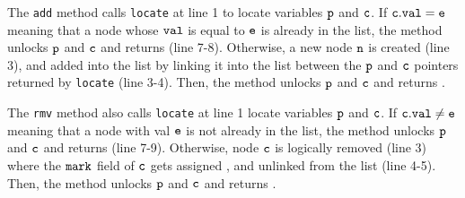  


The {\tt add} method calls {\tt locate} at line 1 to locate variables $\tt p$ and $\tt c$. If $\tt c.val = e$ meaning that a node whose $\tt val$ is equal to $\tt e$ is already in the list, the method unlocks $\tt p$ and $\tt c$ and returns \false \; (line 7-8). Otherwise, a new node $\tt n$ is created (line 3), and added into the list by linking it into the list between the $\tt p$ and $\tt c$ pointers returned by
{\tt locate} (line 3-4). Then, the method unlocks $\tt p$ and $\tt c$ and returns \true.  

The {\tt rmv} method also calls {\tt locate} at line 1 locate variables $\tt p$ and $\tt c$. If $\tt c.val \neq e$ meaning that a node with val $\tt e$ is not already in the list, the method unlocks $\tt p$ and $\tt c$ and returns \false (line 7-9). Otherwise, node $\tt c$ is logically removed (line 3) where the $\tt mark$ field of $\tt c$ gets assigned \true, and unlinked from the list (line 4-5). Then, the method unlocks $\tt p$ and $\tt c$ and returns \true.  

